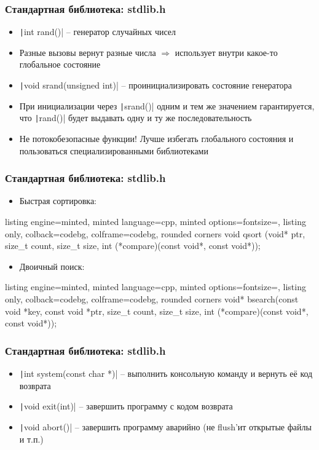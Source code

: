 \documentclass[10pt]{beamer}
\begin{document}
\begin{frame}[fragile]
\frametitle{Стандартная библиотека: stdlib.h}
\begin{itemize}
\item \texttt|int rand()| -- генератор случайных чисел
\pause
\item Разные вызовы вернут разные числа \(\Longrightarrow\) использует внутри какое-то глобальное состояние
\pause
\item \texttt|void srand(unsigned int)| -- проинициализировать состояние генератора
\pause
\item При инициализации через \texttt|srand()| одним и тем же значением гарантируется, что \texttt|rand()| будет выдавать одну и ту же последовательность
\pause
\item Не потокобезопасные функции! Лучше избегать глобального состояния и пользоваться специализированными библиотеками
\end{itemize}
\end{frame}

\begin{frame}[fragile]
\frametitle{Стандартная библиотека: stdlib.h}
\begin{itemize}
\item Быстрая сортировка:
\end{itemize}
\begin{tcblisting}{listing engine=minted, minted language=cpp, minted options={fontsize=\scriptsize}, listing only, colback=codebg, colframe=codebg, rounded corners}
void qsort (void* ptr, size_t count, size_t size,
  int (*compare)(const void*, const void*));
\end{tcblisting}
\pause
\begin{itemize}
\item Двоичный поиск:
\end{itemize}
\begin{tcblisting}{listing engine=minted, minted language=cpp, minted options={fontsize=\scriptsize}, listing only, colback=codebg, colframe=codebg, rounded corners}
void* bsearch(const void *key, const void *ptr, size_t count,
  size_t size, int (*compare)(const void*, const void*));
\end{tcblisting}
\end{frame}

\begin{frame}[fragile]
\frametitle{Стандартная библиотека: stdlib.h}
\begin{itemize}
\item \texttt|int system(const char *)| -- выполнить консольную команду и вернуть её код возврата
\pause
\item \texttt|void exit(int)| -- завершить программу с кодом возврата
\pause
\item \texttt|void abort()| -- завершить программу аварийно (не flush'ит открытые файлы и т.п.)
\end{itemize}
\end{frame}
\end{document}
